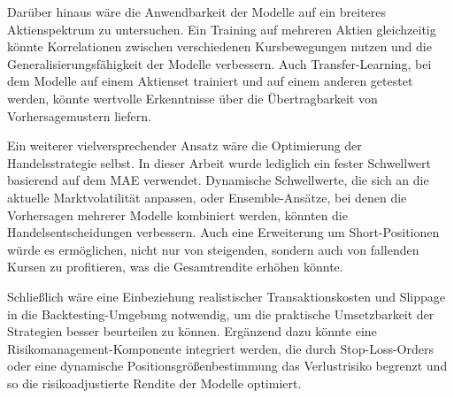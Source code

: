 Darüber hinaus wäre die Anwendbarkeit der Modelle auf ein breiteres Aktienspektrum zu untersuchen. Ein Training auf mehreren Aktien gleichzeitig könnte Korrelationen zwischen verschiedenen Kursbewegungen nutzen und die Generalisierungsfähigkeit der Modelle verbessern. Auch Transfer-Learning, bei dem Modelle auf einem Aktienset trainiert und auf einem anderen getestet werden, könnte wertvolle Erkenntnisse über die Übertragbarkeit von Vorhersagemustern liefern.

Ein weiterer vielversprechender Ansatz wäre die Optimierung der Handelsstrategie selbst. In dieser Arbeit wurde lediglich ein fester Schwellwert basierend auf dem \ac{MAE} verwendet. Dynamische Schwellwerte, die sich an die aktuelle Marktvolatilität anpassen, oder Ensemble-Ansätze, bei denen die Vorhersagen mehrerer Modelle kombiniert werden, könnten die Handelsentscheidungen verbessern. Auch eine Erweiterung um Short-Positionen würde es ermöglichen, nicht nur von steigenden, sondern auch von fallenden Kursen zu profitieren, was die Gesamtrendite erhöhen könnte.

Schließlich wäre eine Einbeziehung realistischer Transaktionskosten und Slippage in die Backtesting-Umgebung notwendig, um die praktische Umsetzbarkeit der Strategien besser beurteilen zu können. Ergänzend dazu könnte eine Risikomanagement-Komponente integriert werden, die durch Stop-Loss-Orders oder eine dynamische Positionsgrößenbestimmung das Verlustrisiko begrenzt und so die risikoadjustierte Rendite der Modelle optimiert.